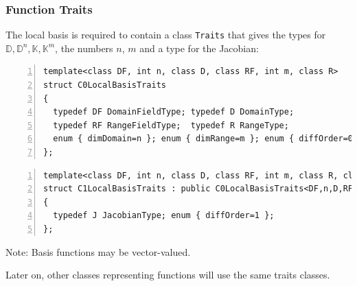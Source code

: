 \begin{frame}[fragile]
\frametitle<presentation>{Function Traits}
The local basis is required to contain a class \lstinline{Traits} that
gives the types for
$\mathbb{D}, \mathbb{D}^n, \mathbb{K}, \mathbb{K}^m$, the numbers $n$,
$m$ and a type for the Jacobian:
\begin{lstlisting}[basicstyle=\ttfamily\scriptsize,numbers=left, 
numberstyle=\tiny, numbersep=5pt]
template<class DF, int n, class D, class RF, int m, class R>
struct C0LocalBasisTraits 
{
  typedef DF DomainFieldType; typedef D DomainType;
  typedef RF RangeFieldType;  typedef R RangeType;
  enum { dimDomain=n }; enum { dimRange=m }; enum { diffOrder=0 };
};
\end{lstlisting}
\begin{lstlisting}[basicstyle=\ttfamily\scriptsize,numbers=left, 
numberstyle=\tiny, numbersep=5pt]
template<class DF, int n, class D, class RF, int m, class R, class J>
struct C1LocalBasisTraits : public C0LocalBasisTraits<DF,n,D,RF,m,R> 
{
  typedef J JacobianType; enum { diffOrder=1 };
};
\end{lstlisting}

Note: Basis functions may be vector-valued.

Later on, other classes representing functions will use the same
traits classes.
\end{frame}

